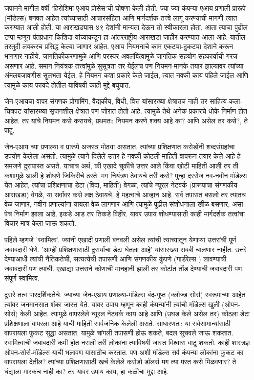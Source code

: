 जपानने मागील वर्षी 'हिरोशिमा एआय प्रोसेस'ची घोषणा केली होती. ज्या ज्या कंपन्या एआय प्रणाली-प्रारूपे (मॉडेल्स) बनवत आहेत त्यांच्यासाठी आचारसंहिता आणि मार्गदर्शक तत्त्वे लागू करण्याची मागणी त्यात करण्यात आली होती. या आराखड्यास ४९ देशांनी मान्यता देऊन तो स्वीकारला होता. आता त्याचा पुढील टप्पा म्हणून पंतप्रधान किशिदा यांच्याकडून हा आंतरराष्ट्रीय आराखडा जाहीर करण्यात आला आहे. यातील तरतुदी लवकरच प्रसिद्ध केल्या जाणार आहेत. एआय नियमनाचे काम एकट्या-दुकट्या देशाने करून भागणार नाहीये. जागतिकीकरणामुळे आणि परस्पर अवलंबित्वामुळे जागतिक सहयोग-सहकार्याची गरज असणार आहे. समान नियंत्रक तत्त्वांमुळे सुसूत्रता तर येईलच पण नियमन-मानके तयार झाल्यावर त्यांच्या अंमलबजावणीस सुलभता येईल. हे नियमन कशा प्रकारे केले जाईल, त्यात नक्की काय पहिले जाईल आणि त्यामुळे काय फायदे होतील याविषयी काही मुद्दे बघुयात.

जेन-एआयचा वापर संगणक प्रोगामिंग, वैद्यकीय, विधी, वित्त यांसारख्या क्षेत्रातच नाही तर साहित्य-कला-चित्रपट यांसारख्या सृजनशील क्षेत्रात पण जोरात होतो आहे. त्यामुळे तेथे अनेक प्रकारचे धोके निर्माण होत आहेत. तर यांचे नियमन कसे करायचे, प्रथमतः: नियमन करणे शक्य आहे का? आणि असेल तर कसे?, ते पाहू.

जेन-एआय च्या प्रणाल्या व प्रारूपे अजस्त्र मोठ्या असतात. त्यांच्या प्रशिक्षणात करोडोंनी शब्दसंग्रहांचा उपयोग केलेला असतो. त्यामुळे त्याने दिलेले उत्तर हे नक्की कोठली माहिती वापरून तयार केले आहे हे समजणे दुरापास्त असते. याचाच अर्थ, की एखादे चुकीचे उत्तर आले किंवा खोटी माहिती आली तर ती कशामुळे आली हे शोधणे जिकिरीचे ठरते. मग नियंत्रण ठेवायचे तरी कसे? पुन्हा दररोज नव-नवीन मॉडेल्स येत आहेत, त्यांचा प्रशिक्षणाचा डेटा (विदा, माहिती) वेगळा, त्यांचे न्यूरल नेटवर्क (प्रारूपाचा संगणकीय आराखडा) वेगळे, या सर्वांवर कसे लक्ष ठेवायचे, हे महत्वाचे आव्हान आहे. सर्व तपासत बसलो तर त्यातच वेळ जाणार, नवीन प्रणाल्यांना यायला वेळ लागणार आणि त्यामुळे पुढील संशोधनाला खीळ बसणार, असा पेच निर्माण झाला आहे. इकडे आड तर तिकडे विहीर. यावर उपाय शोधण्यासाठी काही मार्गदर्शक तत्वांचा विचार मात्र केला जाऊ शकतो.

पहिले म्हणजे 'स्वामित्व'. ज्यांनी एखादी प्रणाली बनवली असेल त्यांची त्याच्यातून येणाऱ्या उत्तरांची पूर्ण जबाबदारी घेणे. 'आम्ही प्रशिक्षणासाठी दुसर्यांचा डेटा घेतला आहे' यांसारख्या सबबी चालणार नाहीत. उत्तरे देण्याआधी त्यांची नैतिकतेची, सत्यत्येची तपासणी आणि संगणकीय कुंपणे (गार्डरेल्स ) लावण्याची जबाबदारी पण त्यांची. एखाद्या उत्तराने कोणाची मानहानी झाली तर कोर्टात तोंड देण्याची जबाबदारी पण. संपूर्ण स्वामित्व.

दुसरे तत्व पारदर्शिकतेचे. ज्यांच्या जेन-एआय प्रणाल्या-मॉडेल्स बंद-गुप्त (क्लोज्ड सोर्स) स्वरूपाच्या आहेत त्यांवर जनमानसात शंका जास्त येते. यावर उपाय म्हणून काही कंपन्यांनी त्यांची मॉडेल्स खुली (ओपन-सोर्स) केली आहेत. त्यामुळे वापरलेले न्यूरल नेटवर्क काय आहे आणि (उघड केले असेल तर) कोठला डेटा प्रशिक्षणाला वापरला आहे याची माहिती सार्वजनिक केलेली असते. साधारणतः: या सर्वसामान्यांसाठी वापरायला फुकट सुद्धा असतात. यामुळे चांगली तपासणी होऊ शकते, बदल सुचवले जाऊ शकतात. स्वामित्वाची जबाबदारी कमी होत नसली तरी लोकांना त्याविषयी जास्त विश्वास वाटू शकतो. काही शास्त्रज्ञ ओपन-सोर्स-मॉडेल्स याची भलावण यासाठीच करतात. पण अशी मॉडेल्स सर्व कंपन्या लोकांना फुकट का वापरायला देतील? त्यांच्या प्रशिक्षणासाठी खर्च केलेले करोडो डॉलर्स मग त्या परत कसे मिळवणार? ते धंद्याला मारकच नाही का? तर यावर उपाय काय, हा कळीचा मुद्दा आहे.


